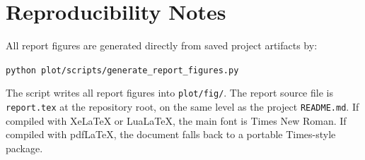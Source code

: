 \documentclass[12pt]{article}
\begin{document}
\section{Reproducibility Notes}

All report figures are generated directly from saved project artifacts by:

\begin{center}
\texttt{python plot/scripts/generate\_report\_figures.py}
\end{center}

The script writes all report figures into \texttt{plot/fig/}. The report source
file is \texttt{report.tex} at the repository root, on the same level as the
project \texttt{README.md}. If compiled with XeLaTeX or LuaLaTeX, the main font
is Times New Roman. If compiled with pdfLaTeX, the document falls back to a
portable Times-style package.
\end{document}
